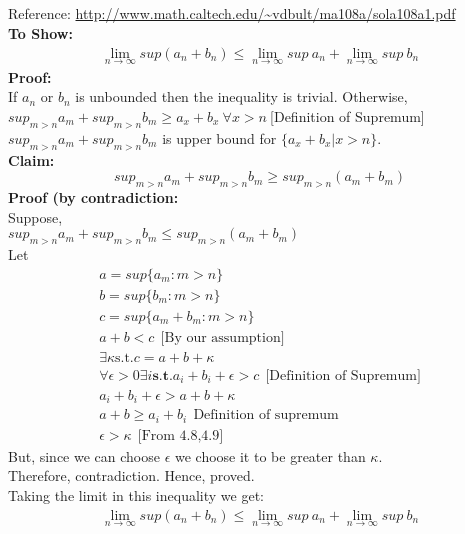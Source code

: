 \documentclass[paper=a4, fontsize=11pt]{scrartcl} %
\numberwithin{equation}{section} %
\numberwithin{figure}{section} %
\numberwithin{table}{section} %
\begin{document}
\subsection{}
Reference: \url{http://www.math.caltech.edu/~vdbult/ma108a/sola108a1.pdf}\\
\textbf{To Show: }
\begin{align*}
	\lim_{n\rightarrow\infty}sup(a_n +b_n) \leq \lim_{n\rightarrow \infty}sup\ a_n + \lim_{n\rightarrow \infty} sup\ b_n
\end{align*}
\textbf{Proof:}\\
If $a_n$ or $b_n$ is unbounded then the inequality is trivial. Otherwise, \\
$sup_{m>n}a_m + sup_{m>n}b_m \geq a_x+b_x \ \forall x>n\ $[Definition of Supremum]\\
$sup_{m>n}a_m + sup_{m>n}b_m$ is upper bound for $\{a_x + b_x | x>n\}$. \\
\textbf{Claim:}\\
\begin{equation}
	sup_{m>n}a_m + sup_{m>n}b_m \geq sup_{m>n}(a_m + b_m)
\end{equation}
\textbf{Proof (by contradiction:}\\
Suppose, \\
$	sup_{m>n}a_m + sup_{m>n}b_m \leq sup_{m>n}(a_m + b_m)$\\
Let
 \begin{align}
	a=sup\{a_m:m>n\}\\
	b=sup\{b_m:m>n\}\\
	c=sup\{a_m + b_m:m>n\}\\	
	a + b<c \ \ \text{[By our assumption]}\\
	\exists \kappa \text{s.t.} c = a + b + \kappa \\
	\forall \epsilon > 0 \exists i \textbf{s.t.} a_i + b_i + \epsilon > c \ \ \text{[Definition of Supremum]}\\
	a_i + b_i + \epsilon > a + b+ \kappa\\
	a+ b \geq a_i + b_i\ \ \text{Definition of supremum} \\
	\epsilon > \kappa \ \ \text{[From 4.8,4.9]}
\end{align}
But, since we can choose $\epsilon$ we choose it to be greater than $\kappa$.\\Therefore, contradiction. Hence, proved. \\
Taking the limit in this inequality we get: 
\begin{align*}
	\lim_{n\rightarrow\infty}sup(a_n +b_n) \leq \lim_{n\rightarrow \infty}sup\ a_n + \lim_{n\rightarrow \infty} sup\ b_n
\end{align*}
\end{document}
